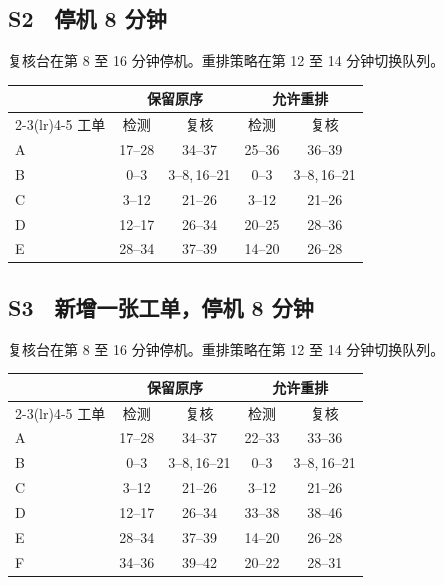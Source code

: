 {\subsection*{S2　停机 8 分钟}
复核台在第 8 至 16 分钟停机。重排策略在第 12 至 14 分钟切换队列。\par
\begin{center}\small
\begingroup\setlength{\tabcolsep}{5pt}
\begin{tabular}{@{}lcccc@{}}
\toprule
 & \multicolumn{2}{c}{保留原序} & \multicolumn{2}{c}{允许重排} \\
\cmidrule(lr){2-3}\cmidrule(lr){4-5}
工单 & 检测 & 复核 & 检测 & 复核 \\
\midrule
A & 17--28 & 34--37 & 25--36 & 36--39 \\
B & 0--3 & 3--8,\,16--21 & 0--3 & 3--8,\,16--21 \\
C & 3--12 & 21--26 & 3--12 & 21--26 \\
D & 12--17 & 26--34 & 20--25 & 28--36 \\
E & 28--34 & 37--39 & 14--20 & 26--28 \\
\bottomrule
\end{tabular}\endgroup
\end{center}
\subsection*{S3　新增一张工单，停机 8 分钟}
复核台在第 8 至 16 分钟停机。重排策略在第 12 至 14 分钟切换队列。\par
\begin{center}\small
\begingroup\setlength{\tabcolsep}{5pt}
\begin{tabular}{@{}lcccc@{}}
\toprule
 & \multicolumn{2}{c}{保留原序} & \multicolumn{2}{c}{允许重排} \\
\cmidrule(lr){2-3}\cmidrule(lr){4-5}
工单 & 检测 & 复核 & 检测 & 复核 \\
\midrule
A & 17--28 & 34--37 & 22--33 & 33--36 \\
B & 0--3 & 3--8,\,16--21 & 0--3 & 3--8,\,16--21 \\
C & 3--12 & 21--26 & 3--12 & 21--26 \\
D & 12--17 & 26--34 & 33--38 & 38--46 \\
E & 28--34 & 37--39 & 14--20 & 26--28 \\
F & 34--36 & 39--42 & 20--22 & 28--31 \\
\bottomrule
\end{tabular}\endgroup
\end{center}
\clearpage
}
